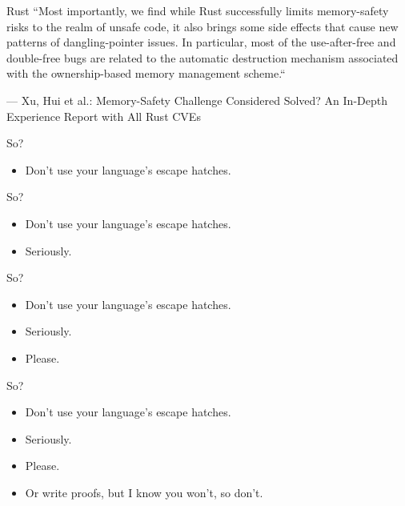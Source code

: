 \documentclass[aspectratio=169,14pt]{beamer}
\begin{document}
  \begin{frame}{Rust}
  ``Most importantly, we find while Rust successfully limits memory-safety risks to
  the realm of unsafe code, it also brings some side effects that cause new
  patterns of dangling-pointer issues. In particular, most of the use-after-free
  and double-free bugs are related to the automatic destruction mechanism
  associated with the ownership-based memory management scheme.``

  --- Xu, Hui et al.: Memory-Safety Challenge Considered Solved? An In-Depth Experience Report with All Rust CVEs
  \end{frame}
  \begin{frame}{So?}
    \begin{itemize}
      \item Don’t use your language’s escape hatches.
    \end{itemize}
  \end{frame}
  \begin{frame}{So?}
    \begin{itemize}
      \item Don’t use your language’s escape hatches.
      \item Seriously.
    \end{itemize}
  \end{frame}
  \begin{frame}{So?}
    \begin{itemize}
      \item Don’t use your language’s escape hatches.
      \item Seriously.
      \item Please.
    \end{itemize}
  \end{frame}
  \begin{frame}{So?}
    \begin{itemize}
      \item Don’t use your language’s escape hatches.
      \item Seriously.
      \item Please.
      \item Or write proofs, but I know you won’t, so don’t.
    \end{itemize}
  \end{frame}
\end{document}

